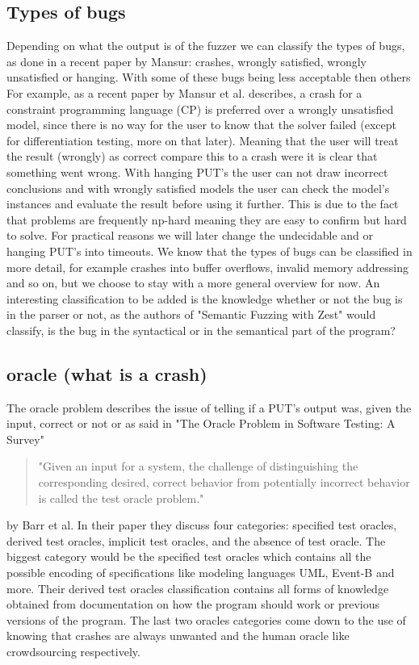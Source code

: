 \subsection{Types of bugs} 
Depending on what the output is of the fuzzer we can classify the types of bugs, as done in a recent paper\cite{1mansur2020detecting} by Mansur: crashes, wrongly satisfied, wrongly unsatisfied or hanging. With some of these bugs being less acceptable then others 
For example, as a recent paper\cite{1mansur2020detecting} by Mansur et al. describes, a crash for a constraint programming language (CP) is preferred over a wrongly unsatisfied model, since there is no way for the user to know that the solver failed (except for differentiation testing, more on that later). Meaning that the user will treat the result (wrongly) as correct compare this to a crash were it is clear that something went wrong.
With hanging PUT's the user can not draw incorrect conclusions and with wrongly satisfied models the user can check the model's instances and evaluate the result before using it further. This is due to the fact that problems are frequently np-hard meaning they are easy to confirm but hard to solve. For practical reasons we will later change the undecidable and or hanging PUT's into timeouts. We know that the types of bugs can be classified in more detail, for example crashes into buffer overflows, invalid memory addressing and so on, but we choose to stay with a more general overview for now. An interesting classification to be added is the knowledge whether or not the bug is in the parser or not, as the authors of "Semantic Fuzzing with Zest"\cite{22SemanticFuzzing} would classify, is the bug in the syntactical or in the semantical part of the program?


\subsection{oracle (what is a crash)}
The oracle problem describes the issue of telling if a PUT's output was, given the input, correct or not or as said in "The Oracle Problem in Software Testing: A Survey"\cite{10barr2014oracleProblem} 
\begin{quote}
	"Given an input for a system, the challenge of distinguishing the corresponding desired, correct behavior from potentially incorrect behavior is called the test oracle problem."
\end{quote} by Barr et al.
In their paper they discuss four categories: specified test oracles, derived test oracles, implicit test oracles, and the absence of test oracle. The biggest category would be the specified test oracles which contains all the possible encoding of specifications like modeling languages UML, Event-B and more. Their derived test oracles classification contains all forms of knowledge obtained from documentation on how the program should work or previous versions of the program. The last two oracles categories come down to the use of knowing that crashes are always unwanted and the human oracle like crowdsourcing respectively.

